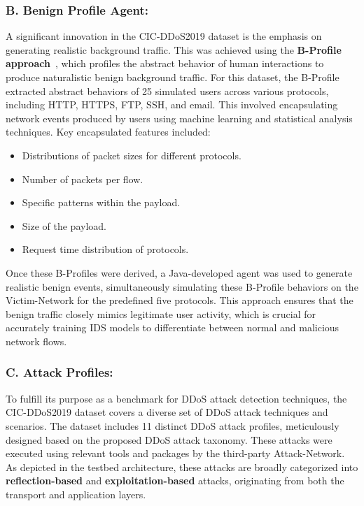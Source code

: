 \documentclass[12pt]{report}
\begin{document}
\subsubsection{B. Benign Profile Agent:}

A significant innovation in the CIC-DDoS2019 dataset is the emphasis on generating realistic background traffic. This was achieved using the \textbf{B-Profile approach}~\cite{sharafaldin2017towards}, which profiles the abstract behavior of human interactions to produce naturalistic benign background traffic. For this dataset, the B-Profile extracted abstract behaviors of 25 simulated users across various protocols, including HTTP, HTTPS, FTP, SSH, and email. This involved encapsulating network events produced by users using machine learning and statistical analysis techniques. Key encapsulated features included:

\begin{itemize}
\item Distributions of packet sizes for different protocols.
\item Number of packets per flow.
\item Specific patterns within the payload.
\item Size of the payload.
\item Request time distribution of protocols.
\end{itemize}

Once these B-Profiles were derived, a Java-developed agent was used to generate realistic benign events, simultaneously simulating these B-Profile behaviors on the Victim-Network for the predefined five protocols. This approach ensures that the benign traffic closely mimics legitimate user activity, which is crucial for accurately training IDS models to differentiate between normal and malicious network flows.

\subsubsection{C. Attack Profiles:}

To fulfill its purpose as a benchmark for DDoS attack detection techniques, the CIC-DDoS2019 dataset covers a diverse set of DDoS attack techniques and scenarios. The dataset includes 11 distinct DDoS attack profiles, meticulously designed based on the proposed DDoS attack taxonomy. These attacks were executed using relevant tools and packages by the third-party Attack-Network. As depicted in the testbed architecture, these attacks are broadly categorized into \textbf{reflection-based} and \textbf{exploitation-based} attacks, originating from both the transport and application layers.
\end{document}
